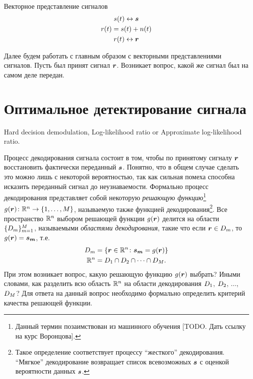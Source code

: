 \documentclass{book}
\numberwithin{theorem}{chapter}
\numberwithin{statement}{chapter}
\numberwithin{lemma}{chapter}
\theoremstyle{definition}
\numberwithin{task}{chapter}
\theoremstyle{remark}
\numberwithin{example}{chapter}
\theoremstyle{definition}
\numberwithin{definition}{chapter}
\theoremstyle{remark}
\theoremstyle{remark}
\numberwithin{lyrics}{section}
\begin{document}
Векторное представление сигналов
\begin{gather}
s(t) \leftrightarrow \boldsymbol{s} \\
r(t) = s(t) + n(t) \\
r(t) \leftrightarrow \boldsymbol{r}
\end{gather}

Далее будем работать с главным образом с векторными представлениями сигналов. Пусть был принят сигнал $\boldsymbol{r}$. Возникает вопрос, какой же сигнал был на самом деле передан.


\section{Оптимальное детектирование сигнала}
Hard decision demodulation, Log-likelihood ratio or Approximate log-likelihood ratio.

Процесс декодирования сигнала состоит в том, чтобы по принятому сигналу $\boldsymbol{r}$ восстановить фактически переданный $\boldsymbol{s}$. Понятно, что в общем случае сделать это можно лишь с некоторой вероятностью, так как сильная помеха способна исказить переданный сигнал до неузнаваемости. Формально процесс декодирования представляет собой некоторую \emph{решающую функцию}\footnote{Данный термин позаимствован из машинного обучения [TODO. Дать ссылку на курс Воронцова].} $g(\boldsymbol{r})\colon \mathbb{R}^{n} \rightarrow \{1, \dots, M\}$, называемую также функцией декодирования\footnote{Такое определение соответствует процессу ``жесткого'' декодирования.  ``Мягкое'' декодирование возвращает список всевозможных $\boldsymbol{s}$ с оценкой вероятности данных $\boldsymbol{s}$.}. Все пространство $\mathbb{R}^{n}$ выбором решающей функции $g(\boldsymbol{r})$ делится на области $\{D_m\}_{m=1}^M$, называемыми \emph{областями декодирования}, такие что если $\boldsymbol{r} \in D_m$, то $g(\boldsymbol{r}) = \boldsymbol{s_m}$, т.е.
\begin{gather}
D_m = \{\boldsymbol{r}\in\mathbb{R}^{n}\colon \boldsymbol{s_m} = g(\boldsymbol{r})\}\\
\mathbb{R}^{n} = D_1 \cap D_2 \cap \dots \cap D_M.
\end{gather}
При этом возникает вопрос, какую решающую функцию $g(\boldsymbol{r})$ выбрать? Иными словами, как разделить всю область $\mathbb{R}^{n}$ на области декодирования $D_1$, $D_2$, $\dots$, $D_M$? Для ответа на данный вопрос необходимо формально определить критерий качества решающей функции.
\end{document}

